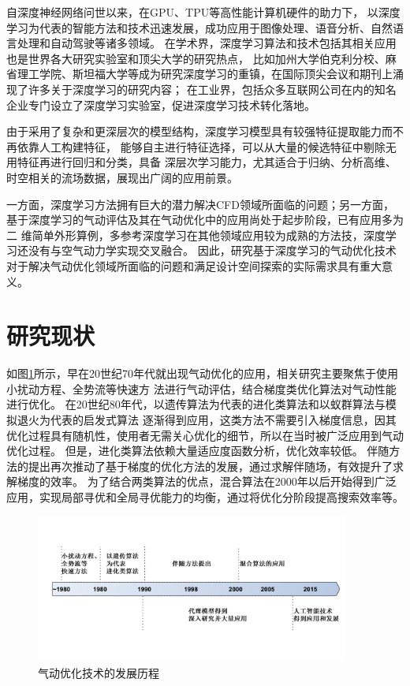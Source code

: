 自深度神经网络问世以来\cite{深度信念网络}，在GPU、TPU等高性能计算机硬件的助力下，
以深度学习为代表的智能方法和技术迅速发展，成功应用于图像处理、语音分析、自然语言处理和自动驾驶等诸多领域。
在学术界，深度学习算法和技术包括其相关应用也是世界各大研究实验室和顶尖大学的研究热点，
比如加州大学伯克利分校、麻省理工学院、斯坦福大学等成为研究深度学习的重镇，在国际顶尖会议和期刊上涌现了许多关于深度学习的研究内容；
在工业界，包括众多互联网公司在内的知名企业专门设立了深度学习实验室，促进深度学习技术转化落地。

由于采用了复杂和更深层次的模型结构，深度学习模型具有较强特征提取能力而不再依靠人工构建特征，
能够自主进行特征选择，可以从大量的候选特征中剔除无用特征再进行回归和分类，具备
深层次学习能力，尤其适合于归纳、分析高维、时空相关的流场数据，展现出广阔的应用前景。

一方面，深度学习方法拥有巨大的潜力解决CFD领域所面临的问题；另一方面，
基于深度学习的气动评估及其在气动优化中的应用尚处于起步阶段，已有应用多为二
维简单外形算例，多参考深度学习在其他领域应用较为成熟的方法技，深度学习还没有与空气动力学实现交叉融合。
因此，研究基于深度学习的气动优化技术对于解决气动优化领域所面临的问题和满足设计空间探索的实际需求具有重大意义。



\section{研究现状}
如图\ref{fig:1}所示，早在20世纪70年代就出现气动优化的应用，相关研究主要聚焦于使用小扰动方程、全势流等快速方
法进行气动评估\cite{70年代1,70年代2}，结合梯度类优化算法对气动性能进行优化。
在20世纪80年代，以遗传算法为代表的进化类算法和以蚁群算法与模拟退火为代表的启发式算法
逐渐得到应用\cite{2000Aerodynamic,Genetic,Obayashi1995Genetic}，这类方法不需要引入梯度信息，因其优化过程具有随机性，使用者无需关心优化的细节，所以在当时被广泛应用到气动优化过程。
但是，进化类算法依赖大量适应度函数分析，优化效率较低。
伴随方法\cite{Jameson2000Aerodynamic}的提出再次推动了基于梯度的优化方法的发展，通过求解伴随场，有效提升了求解梯度的效率。
为了结合两类算法的优点，混合算法在2000年以后开始得到广泛应用，实现局部寻优和全局寻优能力的均衡，通过将优化分阶段提高搜索效率等。

\begin{figure}[htp]
	\centering
	\includegraphics[width=0.92\textwidth]{figures/develop.pdf}
	\caption{气动优化技术的发展历程}
	\label{fig:1}
\end{figure}

